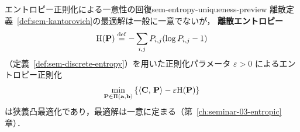 \begin{remark}{エントロピー正則化による一意性の回復}{sem-entropy-uniqueness-preview}
  離散定義~\ref{def:sem-kantorovich}の最適解は一般に一意でないが，
  \textbf{離散エントロピー}
  \[
    \mathrm{H}(\mathbf{P}) \overset{\mathrm{def}}{=} -\sum_{i,j} P_{i,j}(\log P_{i,j} - 1)
  \]
  （定義~\ref{def:sem-discrete-entropy}）を用いた正則化パラメータ $\varepsilon > 0$
  によるエントロピー正則化
  \[
    \min_{\mathbf{P} \in \Pi(\mathbf{a}, \mathbf{b})}
    \left\{
      \langle \mathbf{C},\, \mathbf{P} \rangle
      - \varepsilon \mathrm{H}(\mathbf{P})
    \right\}
  \]
  は狭義凸最適化であり，最適解は一意に定まる（第~\ref{ch:seminar-03-entropic}章）．
\end{remark}
